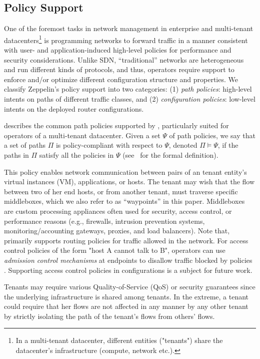 \subsection{Policy Support}
One of the foremost tasks in network management in enterprise 
and multi-tenant datacenters\footnote{
In a multi-tenant datacenter, different entities ("tenants") share the datacenter's 
infrastructure (compute, network etc.).
} 
is programming 
networks to forward traffic in a manner consistent with user- and
application-induced high-level policies for performance and security considerations. 
Unlike SDN, ``traditional'' networks are  heterogeneous and run different kinds of 
protocols, and thus, operators require support to enforce and/or optimize different
configuration structure and properties. 
We classify Zeppelin's policy support into two categories: 
(1) \emph{path policies}: high-level intents on paths of different traffic classes, and 
(2) \emph{configuration policies}: low-level intents on the deployed router configurations. 

 describes 
the common path policies 
supported by \name, particularly suited for operators 
of a multi-tenant datacenter. 
Given  a set $\Psi$ of
path policies, we say that
a set of paths $\Pi$ is policy-compliant with respect to $\Psi$, 
denoted  $\Pi \models \Psi$,
if the paths in $\Pi$ satisfy all the policies in $\Psi$ (see~\cite{genesis} for the formal definition). 


This policy enables network communication
between pairs of an tenant entity's virtual instances (VM), 
applications, or hosts.  
The tenant may wish that the flow
between two of her end hosts, or from another tenant, must traverse
specific middleboxes, which we also refer to as ``waypoints'' in
this paper. Middleboxes are custom processing appliances often used
for security, access control, or performance reasons (e.g.,
firewalls, intrusion prevention systems, monitoring/accounting
gateways, proxies, and load balancers). Note that, \name 
primarily supports routing policies for traffic allowed in the network.
For access control policies of the form "host A cannot talk to B", operators
can use \emph{admission control mechanisms} at endpoints 
to disallow traffic blocked by policies . Supporting access control policies 
in configurations is a subject for future work.    

 Tenants may require various
Quality-of-Service (QoS) or security guarantees since the 
underlying infrastructure is shared among tenants. In the extreme, a
tenant could require that her flows are not affected in any manner
by any other tenant by strictly isolating the path of the tenant's
flows from others' flows. 

